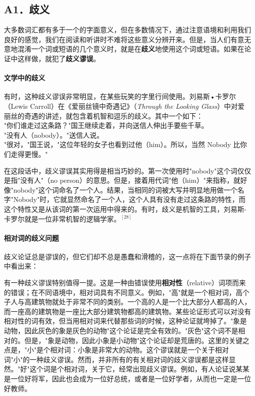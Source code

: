 \subsection{A1．歧义}

大多数词汇都有多于一个的字面意义，但在多数情况下，通过注意语境和利用我们良好的感觉，我们在阅读和听讲时不难将这些意义分辨开来。但是，当人们有意无意地混淆一个词或短语的几个意义时，就是在\textbf{歧义}地使用这个词或短语。如果在论证中这样做，就犯了\textbf{歧义谬误}。

\paragraph{文学中的歧义}
有时，这种歧义谬误非常明显，在某些玩笑的字里行间使用。刘易斯•卡罗尔（Lewis Carroll）在《爱丽丝镜中奇遇记》（\textit{Through the Looking Glass}）中对爱丽丝的奇遇的讲述，就包含着机智和逗乐的歧义。其中一个如下：\\
"你们谁走过这条路？"国王继续走着，并向送信人伸出手要些千草。\\
"没有人（nobody）。"送信人说。\\
"很对，"国王说，"这位年轻的女子也看到过他（him）。所以，当然 Nobody 比你们走得更慢。"

在这段话中，歧义谬误其实用得是相当巧妙的。第一次使用时"nobody"这个词仅仅是指"没有人"（no person）的意思。但是，接着用代词"他（him）"来指称，就好像"nobody"这个词命名了一个人。结果，当相同的词被大写并明显地用做一个名字"Nobody"时，它就显然命名了一个人，这个人具有没有走过这条路的特性，而这个特性又是从该词的第一次运用中得来的。有时，歧义是机智的工具，刘易斯-卡罗尔就是一位非常机智的逻辑学家。${ }^{[28]}$\\

\paragraph{相对词的歧义问题}
歧义论证总是谬误的，但它们却不总是愚蠢和滑稽的，这一点将在下面节录的例子中看出来：

有一种歧义谬误特别值得一提。这是一种由错误使用\textbf{相对性}（relative）词项而来的错误；在不同语境中，相对词具有不同意义。例如，"高"就是一个相对词，高个子人与高建筑物就处于非常不同的类别。一个高的人是一个比大部分人都高的人，而一座高的建筑物是一座比大部分建筑物都高的建筑物。某些论证形式可以对没有相对性的词有效，但当用相对词来代替那些词的时候，这种论证就垮掉了。"象是动物，因此灰色的象是灰色的动物"这个论证是完全有效的。"灰色"这个词不是相对的。但是，"象是动物，因此小象是小动物"这个论证却是荒唐的。这里的关键之点是，"小"是个相对词：小象是非常大的动物。这个谬误就是一个关于相对词"小"的一种歧义谬误。然而，并非所有的有关相对词的歧义谬误都是这样显然。"好"这个词是个相对词，关于它，经常出现歧义谬误。例如，有人论证说某某是一位好将军，因此也会成为一位好总统，或者是一位好学者，从而也一定是一位好教师。 